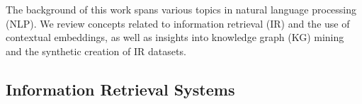 \documentclass[11pt]{article}
\begin{document}
The background of this work spans various topics in natural language processing (NLP). We review concepts related to information retrieval (IR) and the use of contextual embeddings, as well as insights into knowledge graph (KG) mining and the synthetic creation of IR datasets.



\subsection{Information Retrieval Systems}
\end{document}
